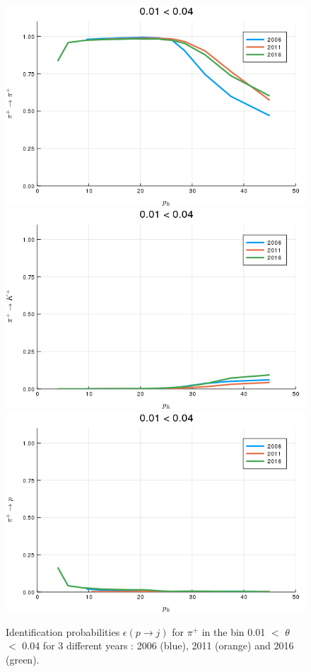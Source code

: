 \begin{figure}[!h]
  \centering
	\includegraphics[scale=0.35]{./gfx/t1/pip2pip.png}
  \includegraphics[scale=0.35]{./gfx/t1/pip2kp.png}
  \includegraphics[scale=0.35]{./gfx/t1/pip2pp.png}
	\caption{Identification probabilities $\epsilon(p \rightarrow j)$ for $\pi^+$ in the bin 0.01 $<$ $\theta$ $<$ 0.04 for 3 different years : 2006 (blue), 2011 (orange) and 2016 (green).}
	\label{pic:comppip}
\end{figure}

